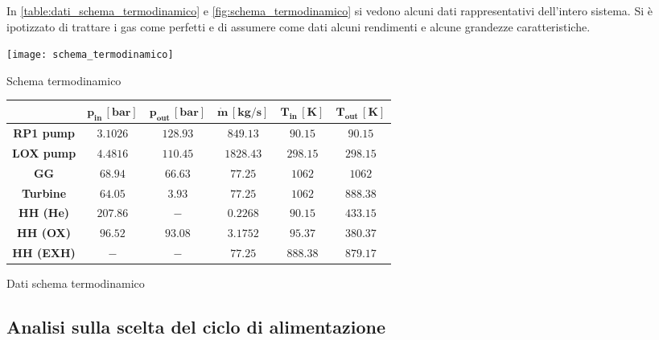 In \autoref{table:dati_schema_termodinamico} e \autoref{fig:schema_termodinamico} si vedono alcuni dati rappresentativi dell'intero sistema. Si è ipotizzato di trattare i gas come perfetti e di assumere come dati alcuni rendimenti e alcune grandezze caratteristiche.

\begin{minipage}{0.4\linewidth}
    \centering
    \captionsetup{type=figure}
    \texttt{[image: schema\_termodinamico]}
    \caption{Schema termodinamico}
    \label{fig:schema_termodinamico}
\end{minipage}\hfill
\begin{minipage}{0.6\linewidth}
    \centering
    \captionsetup{type=table}
    \scriptsize
    \renewcommand{\arraystretch}{2}
    \setlength\extrarowheight{-1pt}
    \begin{tabular}{|c|c|c|c|c|c|}
        \hline
        & $\bm{p_{in} \, [bar]}$ & $\bm{p_{out} \, [bar]}$ & $\bm{\dot{m} \, [kg/s]}$ & $\bm{T_{in} \, [K]}$ & $\bm{T_{out} \, [K]}$ \\
        \hline
        \textbf{RP1 pump} & $3.1026$ & $128.93$ & $849.13$ & $90.15$ & $90.15$ \\
        \hline
        \textbf{LOX pump} & $4.4816$ & $110.45$ & $1828.43$ & $298.15$ & $298.15$ \\
        \hline
        \textbf{GG} & $68.94$ & $66.63$ & $77.25$ & $1062$ & $1062$ \\
        \hline
        \textbf{Turbine} & $64.05$ & $3.93$ & $77.25$ & $1062$ & $888.38$ \\
        \hline
        \textbf{HH (He)} & $207.86$ & $-$ & $0.2268$ & $90.15$ & $433.15$ \\
        \hline
        \textbf{HH (OX)} & $96.52$ & $93.08$ & $3.1752$ & $95.37$ & $380.37$ \\
        \hline
        \textbf{HH (EXH)} & $-$ & $-$ & $77.25$ & $888.38$ & $879.17$ \\
        \hline
    \end{tabular}
    \caption{Dati schema termodinamico}
    \label{table:dati_schema_termodinamico}
\end{minipage}

\subsection{Analisi sulla scelta del ciclo di alimentazione}
\label{subsec:analisi ciclo alimentazione}

